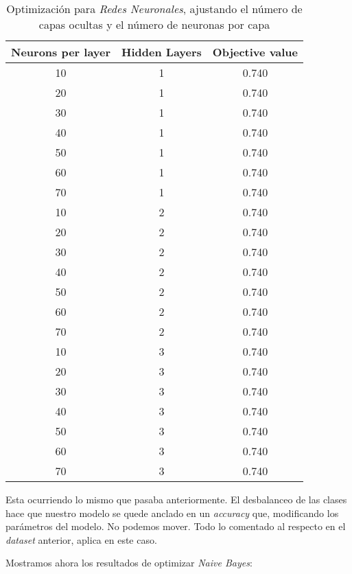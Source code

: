 \documentclass[11pt]{article}
\begin{document}
\begin{table}[H]
\begin{center}
    \begin{tabular}{|c|c|c|}
        \hline
        Neurons per layer & Hidden Layers & Objective value \\
        \hline
        10 & 1 & 0.740 \\
        20 & 1 & 0.740 \\
        30 & 1 & 0.740 \\
        40 & 1 & 0.740 \\
        50 & 1 & 0.740 \\
        60 & 1 & 0.740 \\
        70 & 1 & 0.740 \\
        10 & 2 & 0.740 \\
        20 & 2 & 0.740 \\
        30 & 2 & 0.740 \\
        40 & 2 & 0.740 \\
        50 & 2 & 0.740 \\
        60 & 2 & 0.740 \\
        70 & 2 & 0.740 \\
        10 & 3 & 0.740 \\
        20 & 3 & 0.740 \\
        30 & 3 & 0.740 \\
        40 & 3 & 0.740 \\
        50 & 3 & 0.740 \\
        60 & 3 & 0.740 \\
        70 & 3 & 0.740 \\
        \hline
    \end{tabular}
\end{center}
    \caption{Optimización para \emph{Redes Neuronales}, ajustando el número de capas ocultas y el número de neuronas por capa}
\end{table}

Esta ocurriendo lo mismo que pasaba anteriormente. El desbalanceo de las clases hace que nuestro modelo se quede anclado en un \emph{accuracy} que, modificando los parámetros del modelo. No podemos mover. Todo lo comentado al respecto en el \emph{dataset} anterior, aplica en este caso.

Mostramos ahora los resultados de optimizar \emph{Naive Bayes}:
\end{document}
